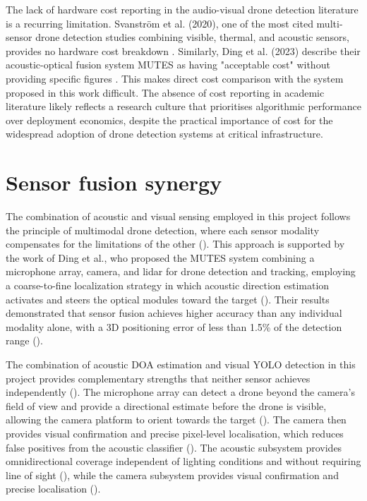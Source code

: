 The lack of hardware cost reporting in the audio-visual drone detection literature is a recurring limitation. Svanström et al. (2020), one of the most cited multi-sensor drone detection studies combining visible, thermal, and acoustic sensors, provides no hardware cost breakdown \cite{svanstrom2020realtime}. Similarly, Ding et al. (2023) describe their acoustic-optical fusion system MUTES as having "acceptable cost" without providing specific figures \cite{ding2023drone}. This makes direct cost comparison with the system proposed in this work difficult. The absence of cost reporting in academic literature likely reflects a research culture that prioritises algorithmic performance over deployment economics, despite the practical importance of cost for the widespread adoption of drone detection systems at critical infrastructure.


\section{Sensor fusion synergy}

The combination of acoustic and visual sensing employed in this project follows 
the principle of multimodal drone detection, where each sensor modality compensates 
for the limitations of the other (\cite{seidaliyeva2024advances}). This approach 
is supported by the work of Ding et al., who proposed the MUTES system combining 
a microphone array, camera, and lidar for drone detection and tracking, employing 
a coarse-to-fine localization strategy in which acoustic direction estimation 
activates and steers the optical modules toward the target 
(\cite{ding2023drone}). Their results demonstrated that sensor fusion achieves 
higher accuracy than any individual modality alone, with a 3D positioning error 
of less than 1.5\% of the detection range (\cite{ding2023drone}).

The combination of acoustic DOA estimation and visual YOLO detection in this 
project provides complementary strengths that neither sensor achieves 
independently (\cite{seidaliyeva2024advances, macedo2025drone}). The microphone 
array can detect a drone beyond the camera's field of view and provide a 
directional estimate before the drone is visible, allowing the camera platform 
to orient towards the target (\cite{ding2023drone}). The camera then provides 
visual confirmation and precise pixel-level localisation, which reduces false 
positives from the acoustic classifier (\cite{seidaliyeva2024advances}). The 
acoustic subsystem provides omnidirectional coverage independent of lighting 
conditions and without requiring line of sight (\cite{ding2023drone}), while 
the camera subsystem provides visual confirmation and precise localisation 
(\cite{seidaliyeva2024advances, macedo2025drone}).

